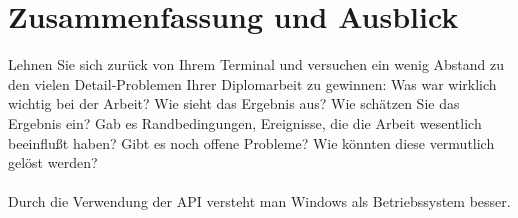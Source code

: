 \chapter{Zusammenfassung und Ausblick}\label{chp:zusammenfassung}
Lehnen Sie sich zurück von Ihrem Terminal und versuchen ein wenig Abstand zu den vielen Detail-Problemen Ihrer Diplomarbeit zu gewinnen:
Was war wirklich wichtig bei der Arbeit? 
Wie sieht das Ergebnis aus?
Wie schätzen Sie das Ergebnis ein?
Gab es Randbedingungen, Ereignisse, die die Arbeit wesentlich beeinflußt haben?
Gibt es noch offene Probleme?
Wie könnten diese vermutlich gelöst werden?\\\\




 Durch die Verwendung der API versteht man Windows als Betriebssystem besser.